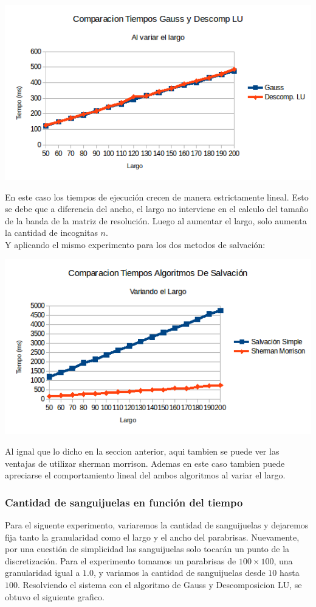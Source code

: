 \begin{center}
 \includegraphics[width=400pt]{imagenes/testeo/largoGauss.png}
\end{center}

En este caso los tiempos de ejecución crecen de manera estrictamente lineal. Esto se debe que a diferencia del ancho, el largo no interviene en el calculo del tamaño de la banda de la matriz de resolución. Luego al aumentar el largo, solo aumenta la cantidad de incognitas $n$.
\\
Y aplicando el mismo experimento para los dos metodos de salvación:

\begin{center}
 \includegraphics[width=400pt]{imagenes/testeo/largoSalv.png}
\end{center}

Al ignal que lo dicho en la seccion anterior, aqui tambien se puede ver las ventajas de utilizar sherman morrison. Ademas en este caso tambien puede apreciarse el comportamiento lineal del ambos algoritmos al variar el largo.

\subsubsection{Cantidad de sanguijuelas en función del tiempo}
Para el siguente experimento, variaremos la cantidad de sanguijuelas y dejaremos fija tanto la granularidad como el largo y el ancho del parabrisas. Nuevamente, por una cuestión de simplicidad las sanguijuelas solo tocarán un punto de la discretización. Para el experimento tomamos un parabrisas de $100 \times 100$, una granularidad igual a $1.0$, y variamos la cantidad de sanguijuelas desde $10$ hasta $100$. Resolviendo el sistema con el algoritmo de Gauss y Descomposicion LU, se obtuvo el siguiente grafico.

